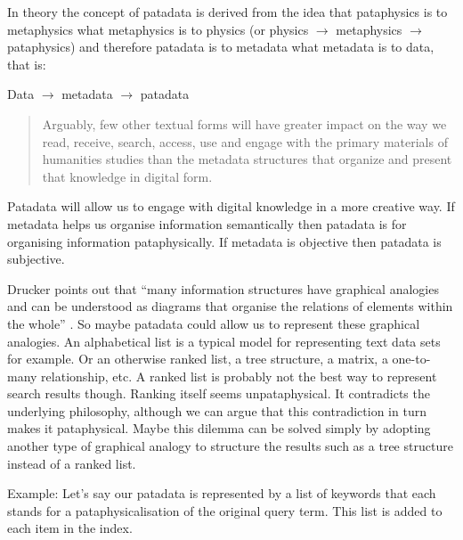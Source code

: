 %   

\spirals

In theory the concept of patadata is derived from the idea that pataphysics is to metaphysics what metaphysics is to physics (or physics $\to$ metaphysics $\to$ pataphysics) and therefore patadata is to metadata what metadata is to data, that is:

Data $\to$ metadata $\to$ patadata

\begin{quotation}
  Arguably, few other textual forms will have greater impact on the way we read, receive, search, access, use and engage with the primary materials of humanities studies than the metadata structures that organize and present that knowledge in digital form. 
\end{quotation}

Patadata will allow us to engage with digital knowledge in a more creative way. If metadata helps us organise information semantically then patadata is for organising information pataphysically. If metadata is objective then patadata is subjective. 

Drucker points out that ``many information structures have graphical analogies and can be understood as diagrams that organise the relations of elements within the whole'' \autocite*{Drucker2009}. So maybe patadata could allow us to represent these graphical analogies. An alphabetical list is a typical model for representing text data sets for example. Or an otherwise ranked list, a tree structure, a matrix, a one-to-many relationship, etc. A ranked list is probably not the best way to represent search results though. Ranking itself seems unpataphysical. It contradicts the underlying philosophy, although we can argue that this contradiction in turn makes it pataphysical. Maybe this dilemma can be solved simply by adopting another type of graphical analogy to structure the results such as a tree structure instead of a ranked list.

Example: Let's say our patadata is represented by a list of keywords that each stands for a pataphysicalisation of the original query term. This list is added to each item in the index.

